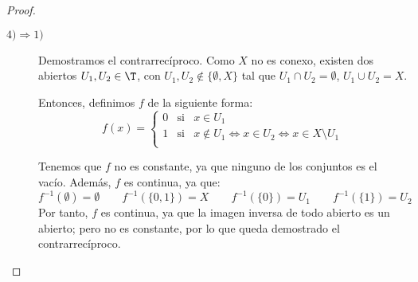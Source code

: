 \begin{proof}
\begin{description}
        \item [$4)\Longrightarrow 1)$] Demostramos el contrarrecíproco. Como $X$ no es conexo, existen dos abiertos $U_1,U_2\in \T$, con $U_1,U_2\notin \{\emptyset, X\}$ tal que $U_1\cap U_2=\emptyset$, $U_1\cup U_2=X$.

        Entonces, definimos $f$ de la siguiente forma:
        \begin{equation*}
            f(x) = \left\{\begin{array}{ccl}
                0 & \text{si} & x\in U_1 \\
                1 & \text{si} & x\notin U_1 \Longleftrightarrow x\in U_2\Longleftrightarrow x\in X\setminus U_1 \\
            \end{array}\right.
        \end{equation*}

        Tenemos que $f$ no es constante, ya que ninguno de los conjuntos es el vacío. Además, $f$ es continua, ya que:
        \begin{equation*}
            f^{-1}(\emptyset)=\emptyset
            \qquad 
            f^{-1}(\{0,1\})=X
            \qquad 
            f^{-1}(\{0\})=U_1
            \qquad 
            f^{-1}(\{1\})=U_2
        \end{equation*}
        Por tanto, $f$ es continua, ya que la imagen inversa de todo abierto es un abierto; pero no es constante, por lo que queda demostrado el contrarrecíproco.
    \end{description}
\end{proof}



